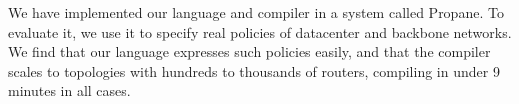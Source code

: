 \documentclass[10pt]{sigalternate052015}
\newcommand{\dpw}[1]{\textcolor{tmlblue}{[dpw: #1]}}
\newcommand{\sysname}{{\small \sf Propane}\xspace}
\begin{document}
We have implemented our language and compiler in a system called \sysname. To evaluate it, we use it to specify real policies of datacenter and backbone networks.
We find that our language expresses such policies easily, and that the compiler scales to topologies with hundreds to thousands of routers, compiling in under 9 minutes in all cases.

%


\end{document}
